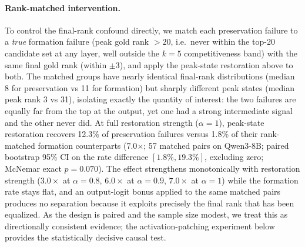 \documentclass{article} %
\begin{document}
\paragraph{Rank-matched intervention.}
To control the final-rank confound directly, we match each preservation failure to a \emph{true} formation failure (peak gold rank $> 20$, i.e.\ never within the top-20 candidate set at any layer, well outside the $k=5$ competitiveness band) with the same final gold rank (within $\pm 3$), and apply the peak-state restoration above to both. The matched groups have nearly identical final-rank distributions (median 8 for preservation vs 11 for formation) but sharply different peak states (median peak rank 3 vs 31), isolating exactly the quantity of interest: the two failures are equally far from the top at the output, yet one had a strong intermediate signal and the other never did. At full restoration strength ($\alpha = 1$), peak-state restoration recovers 12.3\% of preservation failures versus 1.8\% of their rank-matched formation counterparts (7.0$\times$; 57 matched pairs on Qwen3-8B; paired bootstrap 95\% CI on the rate difference $[1.8\%, 19.3\%]$, excluding zero; McNemar exact $p = 0.070$). The effect strengthens monotonically with restoration strength ($3.0\times$ at $\alpha = 0.8$, $6.0\times$ at $\alpha = 0.9$, $7.0\times$ at $\alpha = 1$) while the formation rate stays flat, and an output-logit bonus applied to the same matched pairs produces no separation because it exploits precisely the final rank that has been equalized. As the design is paired and the sample size modest, we treat this as directionally consistent evidence; the activation-patching experiment below provides the statistically decisive causal test.
\end{document}
